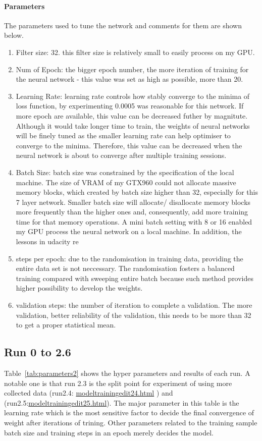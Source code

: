 \documentclass[paper=a4, fontsize=11pt]{scrartcl} %
\numberwithin{equation}{section} %
\numberwithin{figure}{section} %
\numberwithin{table}{section} %
\begin{document}
\paragraph{Parameters}\label{rubric20}
The parameters used to tune the network and comments for them are shown below.
\begin{enumerate}
	\item Filter size: 32. this filter size is relatively small to easily process on my GPU.
	\item Num of Epoch: the bigger epoch number, the more iteration of training for the neural network - this value was set as high as possible, more than 20.	
	\item Learning Rate: learning rate controls how stably converge to the minima of loss function, by experimenting 0.0005 was reasonable for this network. If more epoch are available, this value can be decreased futher by magnitute. Although it would take longer time to train, the weights of neural networks will be finely tuned as the smaller learning rate can help optimiser to converge to the minima. Therefore, this value can be decreased when the neural network is about to converge after multiple training sessions.
	\item Batch Size: batch size was constrained by the specification of the local machine. The size of VRAM of my GTX960 could not allocate massive memory blocks, which created by batch size higher than 32, especially for this 7 layer network. Smaller batch size will allocate/ disallocate memory blocks more frequently than the higher ones and, consequently, add more training time for that memory operations. A mini batch setting with 8 or 16 enabled my GPU process the neural network on a local machine. In addition, the lessons in udacity re
	\item steps per epoch: due to the randomisation in training data, providing the entire data set is not neccessary. The randomisation fosters a balanced training compared with sweeping entire batch because such method provides higher possibility to develop the weights.
	\item validation steps: the number of iteration to complete a validation. The more validation, better reliability of the validation, this needs to be more than 32 to get a proper statistical mean.
\end{enumerate}

\subsection{Run 0 to 2.6}\label{rubric21}
Table~\ref{tab:parameters2} shows the hyper parameters and results of each run. A notable one is that run 2.3 is the split point for experiment of using more collected data (run2.4: \href{run:./JupyterNotebooks/modeltrainingedit24.html}{modeltrainingedit24.html} ) and (run2.5:\href{run:./JupyterNotebooks/modeltrainingedit25.html}{modeltrainingedit25.html}).
The major parameter in this table is the learning rate which is the most sensitive factor to decide the final convergence of weight after iterations of trining. Other parameters related to the training sample batch size and training steps in an epoch merely decides the model.
\end{document}
